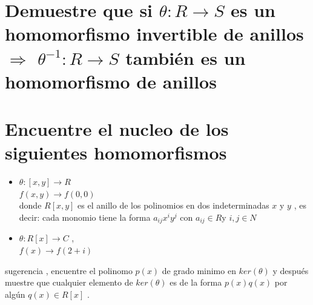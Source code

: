 \documentclass[10pt,a4paper]{article} %
\begin{document}
    \section{Demuestre que si $ \theta : R \to S  $ es un homomorfismo
    invertible de anillos $ \Rightarrow  $  $ \theta ^{-1} : R \to S  $ también
    es un homomorfismo de anillos}

    \section{Encuentre el nucleo de los siguientes homomorfismos}
    \begin{itemize}
        \item {        $ \theta :[x,y] \to R  $
    \\ $ f(x,y) \to f(0,0)  $
    \\ donde $ R[x,y]  $ es el anillo de los polinomios en dos indeterminadas $
    x  $ y $ y  $ , es decir: cada monomio  tiene la forma $ a_{ij}x ^{i} y
    ^{j}   $ con $ a_{ij} \in R $y $ i,j \in N  $}
    \item {$ \theta : R[x] \to C  $ ,
        \\ $ f(x) \to f(2+i)  $  }
    \end{itemize}

    sugerencia ,  encuentre el polinomo $ p(x)  $ de grado minimo en $
    ker(\theta )  $ y después muestre que cualquier elemento de $ ker(\theta )
    $ es de la forma $ p(x)q(x)  $   por algún $ q(x) \in R[x]  $ .










    \nocite{*}
    
    
\end{document}

